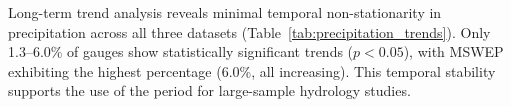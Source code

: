 


Long-term trend analysis reveals minimal temporal non-stationarity in precipitation across all 
three datasets (Table~\ref{tab:precipitation_trends}). Only 1.3--6.0\% of gauges show statistically 
significant trends ($p < 0.05$), with MSWEP exhibiting the highest percentage (6.0\%, all increasing). 
This temporal stability supports the use of the \years period for large-sample hydrology studies.


